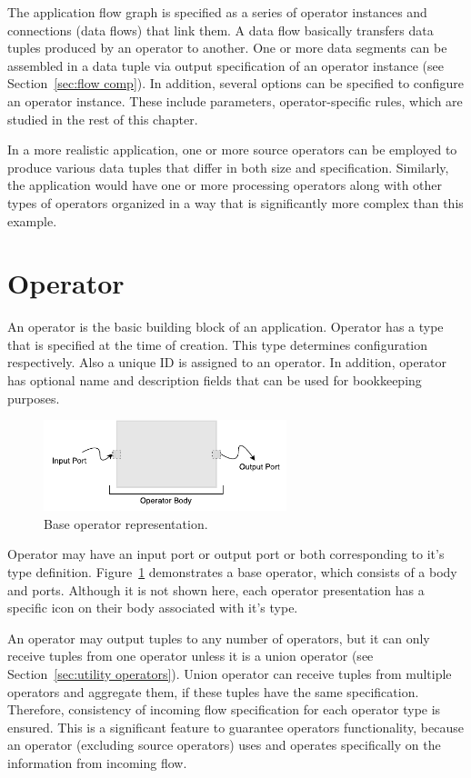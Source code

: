 The application flow graph is specified as a series of operator instances and connections 
(data flows) that link them. A data flow basically transfers data tuples 
produced by an operator to another. One or more data segments can be assembled in a 
data tuple via output specification of an operator instance (see Section~\ref{sec:flow comp}). 
In addition, several options can be specified to configure an operator instance. These 
include parameters, operator-specific rules, which are studied in the rest of this chapter.

In a more realistic application, one or more source operators can be employed to produce 
various data tuples that differ in both size and specification. Similarly, the application would 
have one or more processing operators along with other types of operators organized in a way 
that is significantly more complex than this example.

\section{Operator}
\label{sec:operator}
An operator is the basic building block of an application. Operator has a type that is 
specified at the time of creation. This type determines configuration respectively. Also a 
unique ID is assigned to an operator. In addition, operator has optional name and 
description fields that can be used for bookkeeping purposes.

\begin{figure}[ht]
	\centering
	\includegraphics[height=100px]{figures/basicoperator.pdf}
	\caption{Base operator representation.}
	\label{fig:basic operator}
\end{figure}

Operator may have an input port or output port or both corresponding to it's type 
definition. Figure~\ref{fig:basic operator} demonstrates a base operator, which 
consists of a body and ports. Although it is not shown here, each operator presentation 
has a specific icon on their body associated with it's type.

An operator may output tuples to any number of operators, but it can only receive 
tuples from one operator unless it is a union operator (see Section~\ref{sec:utility operators}). 
Union operator can receive tuples from multiple operators and aggregate them,
if these tuples have the same specification. Therefore, consistency of incoming flow 
specification for each operator type is ensured. 
This is a significant feature to guarantee operators functionality, because an operator 
(excluding source operators) uses and operates specifically on the 
information from incoming flow.


